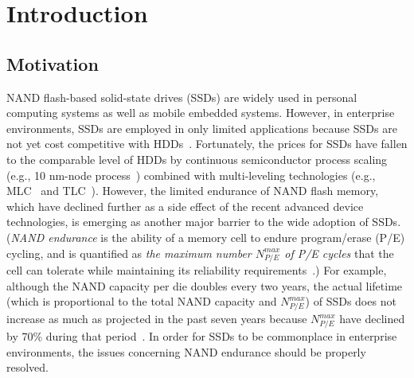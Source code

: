 
\chapter{Introduction} 
\label{chap:Introduction}

\section{Motivation}
\label{sec:Intro_Motivation}

NAND flash-based solid-state drives (SSDs) are widely used in personal computing systems as well as mobile embedded systems.
However, in enterprise environments, SSDs are employed in only limited applications because SSDs are not yet cost competitive with HDDs~\cite{Janus_albrecht}.
Fortunately, the prices for SSDs have fallen to the comparable level of HDDs by continuous semiconductor process scaling (e.g., 10 nm-node process~\cite{15nmMLC_Sako}) combined with multi-leveling technologies (e.g., MLC~\cite{21nmMLC_Kim} and TLC~\cite{TLC_Shin}).
However, the limited endurance of NAND flash memory, which have declined further as a side effect of the recent advanced device technologies, is emerging as another major barrier to the wide adoption of SSDs.
(\textit{NAND endurance} is the ability of a memory cell to endure program/erase (P/E) cycling, and is quantified as \textit{the maximum number $N_{P/E}^{max}$ of P/E cycles} that the cell can tolerate while maintaining its reliability requirements~\cite{Flash_Brewer}.)
For example, although the NAND capacity per die doubles every two years, the actual lifetime (which is proportional to the total NAND capacity and $N_{P/E}^{max}$) of SSDs does not increase as much as projected in the past seven years because $N_{P/E}^{max}$ have declined by 70\% during that period~\cite{MooresLaw_chien}.
In order for SSDs to be commonplace in enterprise environments, the issues concerning NAND endurance should be properly resolved.

